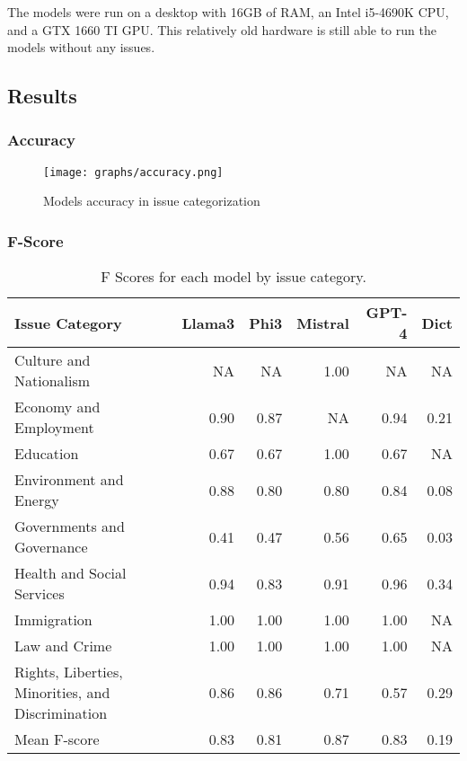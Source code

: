 \documentclass[
  authoryear,
  preprint,
  3p]{elsarticle}
\begin{document}
The models were run on a desktop with 16GB of RAM, an Intel i5-4690K
CPU, and a GTX 1660 TI GPU. This relatively old hardware is still able
to run the models without any issues.

\subsection{Results}\label{results}

\subsubsection{Accuracy}\label{accuracy}

\begin{figure}[H]

{\centering \texttt{[image: graphs/accuracy.png]}

}

\caption{Models accuracy in issue categorization}

\end{figure}%

\subsubsection{F-Score}\label{f-score}

\begin{table}[H]

\caption{F Scores for each model by issue category.}
\centering
\begin{tabular}[t]{lrrrrr}
\toprule
Issue Category & Llama3 & Phi3 & Mistral & GPT-4 & Dict\\
\midrule
Culture and Nationalism & NA & NA & 1.00 & NA & NA\\
Economy and Employment & 0.90 & 0.87 & NA & 0.94 & 0.21\\
Education & 0.67 & 0.67 & 1.00 & 0.67 & NA\\
Environment and Energy & 0.88 & 0.80 & 0.80 & 0.84 & 0.08\\
Governments and Governance & 0.41 & 0.47 & 0.56 & 0.65 & 0.03\\
\addlinespace
Health and Social Services & 0.94 & 0.83 & 0.91 & 0.96 & 0.34\\
Immigration & 1.00 & 1.00 & 1.00 & 1.00 & NA\\
Law and Crime & 1.00 & 1.00 & 1.00 & 1.00 & NA\\
Rights, Liberties, Minorities, and Discrimination & 0.86 & 0.86 & 0.71 & 0.57 & 0.29\\
Mean F-score & 0.83 & 0.81 & 0.87 & 0.83 & 0.19\\
\bottomrule
\end{tabular}
\end{table}
\end{document}
